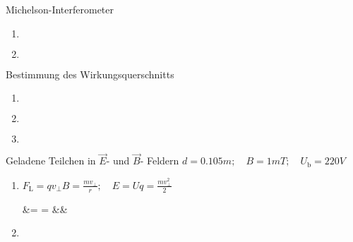 \documentclass{alex_hü}
\begin{document}
\renewcommand{\labelenumi}{\alph{enumi})}


\begin{mybox}{Michelson-Interferometer}
	\centering \(  \)
	\tcblower
	\begin{enumerate}
		\item \(  \)
%			
	\tcbline
		\item \(  \)
%		
	\end{enumerate}
\end{mybox}

\begin{mybox}{Bestimmung des Wirkungsquerschnitts}
	\centering \(  \)
	\tcblower
	\begin{enumerate}
		\item \(  \)
	\tcbline
		\item \(  \)
	\tcbline
		\item \(  \)
	\end{enumerate}
\end{mybox}

\begin{mybox}{Geladene Teilchen in \( \vec{E} \)- und \( \vec{B} \)- Feldern}
	\centering \( d = 0.105 \unit{m};\quad B = 1 \unit{mT};\quad U_{\text{b}} = 220 \unit{V} \)
	\tcblower
	\begin{enumerate}
		\item \( F_{\text{L}} = qv_{\perp}B = \tfrac{mv_{\perp}}{r};\quad E = Uq = \tfrac{mv_{\perp}^2}{2}\)
		\begin{flalign*}
			 &=  =  &&
		\end{flalign*}
	\tcbline
		\item \(  \)
	\end{enumerate}
\end{mybox}
\end{document}

